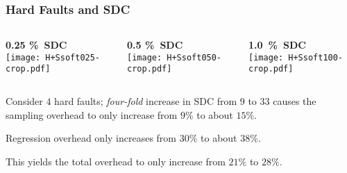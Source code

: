 \begin{frame}
\frametitle{Hard Faults and SDC}
%
\begin{columns}
\hspace{-1cm}

\begin{column}{0.33\textwidth}
\begin{center}
{\bf 0.25 \%~SDC}\\
\vspace{0.15cm}
\texttt{[image: H+Ssoft025-crop.pdf]}
\end{center}
\end{column}
%
\begin{column}{0.33\textwidth}
\begin{center}
{\bf 0.5 \%~SDC}\\
\vspace{0.15cm}
\texttt{[image: H+Ssoft050-crop.pdf]}
\end{center}
\end{column}
%
\begin{column}{0.33\textwidth}
\begin{center}
{\bf 1.0~\%~SDC}\\
\vspace{0.15cm}
\texttt{[image: H+Ssoft100-crop.pdf]}
\end{center}
\end{column}
\end{columns}
%
\vspace{0.1cm}
%
\begin{columns}
\begin{column}{1.1\textwidth}
\bi
\item Consider $4$ hard faults; \textit{four-fold} increase in 
SDC from $9$ to $33$ causes 
the sampling overhead to only increase from $9 \%$ to about $15 \%$. 
\item Regression overhead only increases from $30 \%$ to about $38 \%$. 
\item This yields the total overhead to 
only increase from $21 \%$ to $28 \%$. 
\ei
\end{column}
\end{columns}
%
\end{frame}






